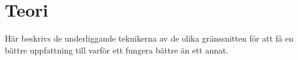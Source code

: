 \section{Teori}
\label{sec:tim-theory}
Här beskrivs de underliggande teknikerna av de olika gränssnitten för att få en bättre uppfattning till varför ett fungera bättre än ett annat.

